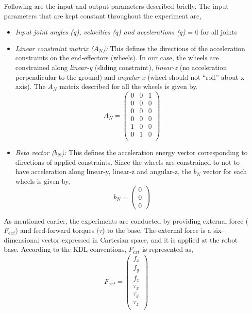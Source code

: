 Following are the input and output parameters described briefly. The input parameters that are kept constant throughout the experiment are,

\begin{itemize}
	\item \textit{Input joint angles (q), velocities ($\dot{q}$) and accelerations ($\ddot{q}$)} = 0 for all joints
	\item \textit{Linear constraint matrix ($A_N$):} This defines the directions of the acceleration constraints on the end-effectors (wheels). In our case, the wheels are constrained along \textit{linear-y} (sliding constraint), \textit{linear-z} (no acceleration perpendicular to the ground) and \textit{angular-x} (wheel should not ``roll'' about x-axis). The $A_N$ matrix described for all the wheels is given by, 
	\begin{equation}
		A_N = \begin{pmatrix}
		 0 & 0 & 1 \\
		 0 & 0 & 0 \\
		 0 & 0 & 0 \\
		 0 & 0 & 0 \\
		 1 & 0 & 0 \\
		 0 & 1 & 0 \\
		\end{pmatrix}
	\end{equation} 
	\item \textit{Beta vector ($b_N$):} This defines the acceleration energy vector corresponding to directions of applied constraints. Since the wheels are constrained to not to have acceleration along linear-y, linear-z and angular-z, the $b_N$ vector for each wheels is given by,
	\begin{equation}
		b_N = \begin{pmatrix}
		0 \\
		0 \\
		0
		\end{pmatrix}
	\end{equation}
\end{itemize}

As mentioned earlier, the experiments are conducted by providing external force ($F_{ext}$) and feed-forward torques ($\tau$) to the base. The external force is a six-dimensional vector expressed in Cartesian space, and it is applied at the robot base. According to the KDL conventions, $F_{ext}$ is represented as, 
\begin{equation}
	F_{ext} = \begin{pmatrix}
		f_x \\
		f_y \\
		f_z\\
		\tau_x \\
		\tau_y \\
		\tau_z\\
	\end{pmatrix}
\end{equation} 

